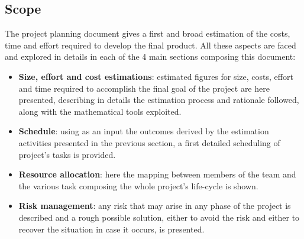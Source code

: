 \subsection{Scope}

The project planning document gives a first and broad estimation of the costs, time and effort required to develop the final product.
All these aspects are faced and explored in details in each of the 4 main sections composing this document:

\begin{itemize}
	\item \textbf{Size, effort and cost estimations}: estimated figures for size, costs, effort and time required to accomplish the final goal of the project are here presented, describing in details the estimation process and rationale followed, along with the mathematical tools exploited.

	\item \textbf{Schedule}: using as an input the outcomes derived by the estimation activities presented in the previous section, a first detailed scheduling of project's tasks is provided.

	\item \textbf{Resource allocation}: here the mapping between members of the team and the various task composing the whole project's life-cycle is shown.

	\item \textbf{Risk management}: any risk that may arise in any phase of the project is described and a rough possible solution, either to avoid the risk and either to recover the situation in case it occurs, is presented.
\end{itemize}
